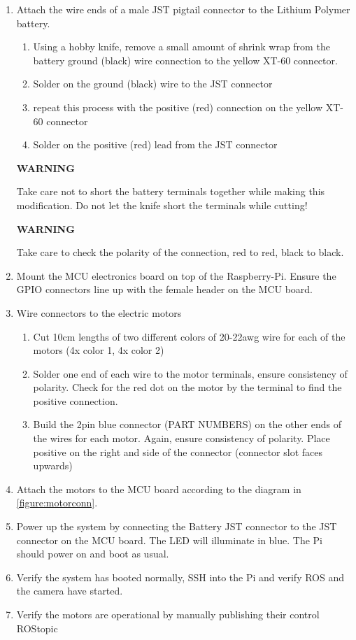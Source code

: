 \documentclass[12pt,titlepage,oneside]{memoir}
\begin{document}
\begin{enumerate}
\item Attach the wire ends of a male JST pigtail connector to the Lithium Polymer battery.\\
	\begin{enumerate}
	\item Using a hobby knife, remove a small amount of shrink wrap from the battery ground (black) wire connection to the yellow XT-60 connector.
	\item Solder on the ground (black) wire to the JST connector
	\item repeat this process with the positive (red) connection on the yellow XT-60 connector
	\item Solder on the positive (red) lead from the JST connector\\
	\end{enumerate}
	\begin{center}\textbf{WARNING}\end{center}
	Take care not to short the battery terminals together while making this modification. Do not let the knife short the terminals while cutting!\\
	\begin{center}\textbf{WARNING}\end{center}
	Take care to check the polarity of the connection, red to red, black to black.
	\item Mount the MCU electronics board on top of the Raspberry-Pi. Ensure the GPIO connectors line up with the female header on the MCU board.
	\item Wire connectors to the electric motors
	\begin{enumerate}
		\item Cut 10cm lengths of two different colors of 20-22awg wire for each of the motors (4x color 1, 4x color 2)
		\item Solder one end of each wire to the motor terminals, ensure consistency of polarity. Check for the red dot on the motor by the terminal to find the positive connection.
		\item Build the 2pin blue connector (PART NUMBERS) on the other ends of the wires for each motor. Again, ensure consistency of polarity. Place positive on the right and side of the connector (connector slot faces upwards)	
	\end{enumerate}
	\item Attach the motors to the MCU board according to the diagram in \ref{figure:motorconn}.
	\item Power up the system by connecting the Battery JST connector to the JST connector on the MCU board. The LED will illuminate in blue. The Pi should power on and boot as usual. 
	\item Verify the system has booted normally, SSH into the Pi and verify ROS and the camera have started.
	\item Verify the motors are operational by manually publishing their control ROStopic
	\begin{enumerate}
	

\end{enumerate}
\end{enumerate}
\end{document}
